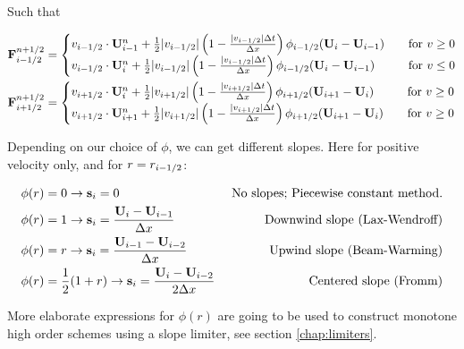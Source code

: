 Such that

\begin{align*}
	\mathbf{F}_{i-1/2}^{n+1/2} &= 
		\begin{cases}
			v_{i-1/2} \cdot \mathbf{U}_{i-1}^n + \frac{1}{2} |v_{i-1/2}|  \left(1 -  \frac{|v_{i-1/2}| \Delta t}{\Delta x} \right) \phi_{i-1/2} ( \mathbf{U}_i - \mathbf{U}_{i-1} )
			 	& \quad \text{for } v \geq 0 \\
			v_{i-1/2} \cdot \mathbf{U}_{i}^n + \frac{1}{2} |v_{i-1/2}|  \left(1 -  \frac{|v_{i-1/2}| \Delta t}{\Delta x} \right) \phi_{i-1/2} ( \mathbf{U}_i - \mathbf{U}_{i-1} )
				& \quad \text{for } v \leq 0 \\
		\end{cases} \\		
	\mathbf{F}_{i+1/2}^{n+1/2} &= 
		\begin{cases}
			v_{i+1/2} \cdot \mathbf{U}_{i}^n + \frac{1}{2} |v_{i+1/2}|  \left(1 -  \frac{|v_{i+1/2}| \Delta t}{\Delta x} \right) \phi_{i+1/2} ( \mathbf{U}_{i+1} - \mathbf{U}_{i} )
			 	& \quad \text{for } v \geq 0 \\
			v_{i+1/2} \cdot \mathbf{U}_{i+1}^n + \frac{1}{2} |v_{i+1/2}|  \left(1 -  \frac{|v_{i+1/2}| \Delta t}{\Delta x} \right) \phi_{i+1/2} ( \mathbf{U}_{i+1} - \mathbf{U}_{i} )
			 	& \quad \text{for } v \geq 0 \\
		\end{cases} \\		
\end{align*}






Depending on our choice of $\phi$, we can get different slopes. 
Here for positive velocity only, and for $r = r_{i-1/2}$:

\begin{align*}
	\phi(r) & = 0 \rightarrow \mathbf{s}_i = 0 
		&\text{ No slopes; Piecewise constant method.}\\
	\phi(r) & = 1 \rightarrow \mathbf{s}_i = \frac{\mathbf{U}_{i} - \mathbf{U}_{i-1}}{\Delta x} 
		&\text{ Downwind slope (Lax-Wendroff)} \\
	\phi(r) & = r \rightarrow \mathbf{s}_i = \frac{\mathbf{U}_{i-1} - \mathbf{U}_{i-2}}{\Delta x} 
		&\text{Upwind slope (Beam-Warming)} \\
	\phi(r) & = \frac{1}{2} (1 + r) \rightarrow \mathbf{s}_i = \frac{\mathbf{U}_{i} - \mathbf{U}_{i-2}}{2 \Delta x} 
		&\text{ Centered slope (Fromm)} \\
\end{align*}


More elaborate expressions for $\phi(r)$ are going to be used to construct monotone high order schemes using a slope limiter, see section \ref{chap:limiters}.

